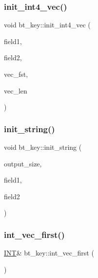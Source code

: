 \subsubsection{\texorpdfstring{init\+\_\+int4\+\_\+vec()}{init\_int4\_vec()}}
{\footnotesize\ttfamily void bt\+\_\+key\+::init\+\_\+int4\+\_\+vec (\begin{DoxyParamCaption}\item[{\mbox{\hyperlink{galois_8h_a09fddde158a3a20bd2dcadb609de11dc}{I\+NT}}}]{field1,  }\item[{\mbox{\hyperlink{galois_8h_a09fddde158a3a20bd2dcadb609de11dc}{I\+NT}}}]{field2,  }\item[{\mbox{\hyperlink{galois_8h_a09fddde158a3a20bd2dcadb609de11dc}{I\+NT}}}]{vec\+\_\+fst,  }\item[{\mbox{\hyperlink{galois_8h_a09fddde158a3a20bd2dcadb609de11dc}{I\+NT}}}]{vec\+\_\+len }\end{DoxyParamCaption})}

\mbox{\label{classbt__key_a37c5830aa6abd2f9892a649e1b5d4248}} 
\subsubsection{\texorpdfstring{init\+\_\+string()}{init\_string()}}
{\footnotesize\ttfamily void bt\+\_\+key\+::init\+\_\+string (\begin{DoxyParamCaption}\item[{\mbox{\hyperlink{galois_8h_a09fddde158a3a20bd2dcadb609de11dc}{I\+NT}}}]{output\+\_\+size,  }\item[{\mbox{\hyperlink{galois_8h_a09fddde158a3a20bd2dcadb609de11dc}{I\+NT}}}]{field1,  }\item[{\mbox{\hyperlink{galois_8h_a09fddde158a3a20bd2dcadb609de11dc}{I\+NT}}}]{field2 }\end{DoxyParamCaption})}

\mbox{\label{classbt__key_a4ed68c3deb2477a0609065272b5dc4cf}} 
\subsubsection{\texorpdfstring{int\+\_\+vec\+\_\+first()}{int\_vec\_first()}}
{\footnotesize\ttfamily \mbox{\hyperlink{galois_8h_a09fddde158a3a20bd2dcadb609de11dc}{I\+NT}}\& bt\+\_\+key\+::int\+\_\+vec\+\_\+first (\begin{DoxyParamCaption}{ }\end{DoxyParamCaption})\hspace{0.3cm}{\ttfamily [inline]}}


